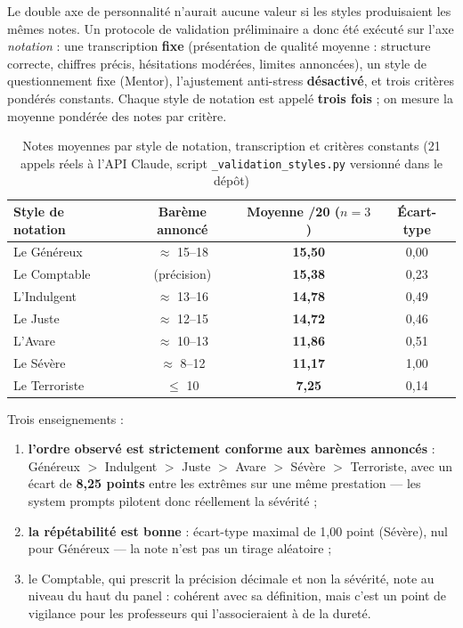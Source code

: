 \documentclass[12pt,a4paper]{report}
\begin{document}
Le double axe de personnalité n'aurait aucune valeur si les styles
produisaient les mêmes notes. Un protocole de validation préliminaire a donc
été exécuté sur l'axe \emph{notation} : une transcription \textbf{fixe}
(présentation de qualité moyenne : structure correcte, chiffres précis,
hésitations modérées, limites annoncées), un style de questionnement fixe
(Mentor), l'ajustement anti-stress \textbf{désactivé}, et trois critères
pondérés constants. Chaque style de notation est appelé \textbf{trois fois} ;
on mesure la moyenne pondérée des notes par critère.

\begin{table}[H]
\centering\small
\begin{tabular}{lccc}
\toprule
\textbf{Style de notation} & \textbf{Barème annoncé} & \textbf{Moyenne /20 ($n=3$)} & \textbf{Écart-type} \\
\midrule
Le Généreux    & $\approx$ 15--18 & \textbf{15{,}50} & 0{,}00 \\
Le Comptable   & (précision)      & \textbf{15{,}38} & 0{,}23 \\
L'Indulgent    & $\approx$ 13--16 & \textbf{14{,}78} & 0{,}49 \\
Le Juste       & $\approx$ 12--15 & \textbf{14{,}72} & 0{,}46 \\
L'Avare        & $\approx$ 10--13 & \textbf{11{,}86} & 0{,}51 \\
Le Sévère      & $\approx$ 8--12  & \textbf{11{,}17} & 1{,}00 \\
Le Terroriste  & $\leq$ 10        & \textbf{7{,}25}  & 0{,}14 \\
\bottomrule
\end{tabular}
\caption{Notes moyennes par style de notation, transcription et critères
constants (21 appels réels à l'API Claude, script
\texttt{\_validation\_styles.py} versionné dans le dépôt)}
\label{tab:validation}
\end{table}

Trois enseignements :
\begin{enumerate}
  \item \textbf{l'ordre observé est strictement conforme aux barèmes
        annoncés} : Généreux $>$ Indulgent $>$ Juste $>$ Avare $>$ Sévère $>$
        Terroriste, avec un écart de \textbf{8{,}25 points} entre les
        extrêmes sur une même prestation --- les system prompts pilotent donc
        réellement la sévérité ;
  \item \textbf{la répétabilité est bonne} : écart-type maximal de 1{,}00
        point (Sévère), nul pour Généreux --- la note n'est pas un tirage
        aléatoire ;
  \item le Comptable, qui prescrit la précision décimale et non la sévérité,
        note au niveau du haut du panel : cohérent avec sa définition, mais
        c'est un point de vigilance pour les professeurs qui l'associeraient
        à de la dureté.
\end{enumerate}
\end{document}
